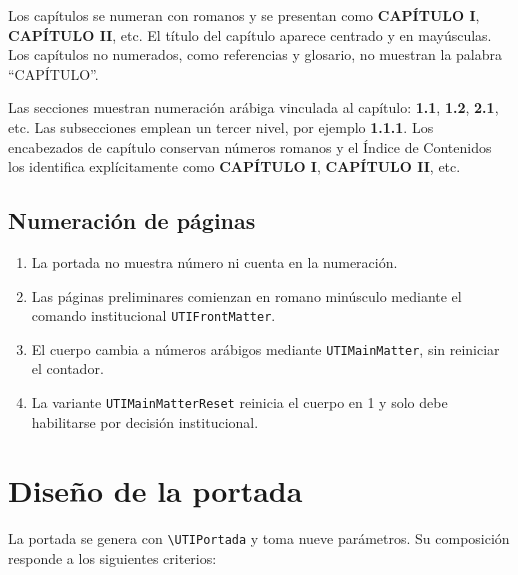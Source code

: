 \documentclass[12pt,a4paper,oneside]{report}
\begin{document}
Los capítulos se numeran con romanos y se presentan como \textbf{CAPÍTULO I}, \textbf{CAPÍTULO II}, etc. El título del capítulo aparece centrado y en mayúsculas. Los capítulos no numerados, como referencias y glosario, no muestran la palabra ``CAPÍTULO''.

Las secciones muestran numeración arábiga vinculada al capítulo: \textbf{1.1}, \textbf{1.2}, \textbf{2.1}, etc. Las subsecciones emplean un tercer nivel, por ejemplo \textbf{1.1.1}. Los encabezados de capítulo conservan números romanos y el Índice de Contenidos los identifica explícitamente como \textbf{CAPÍTULO I}, \textbf{CAPÍTULO II}, etc.

\section{Numeración de páginas}

\begin{enumerate}
  \item La portada no muestra número ni cuenta en la numeración.
  \item Las páginas preliminares comienzan en romano minúsculo mediante el comando institucional \texttt{UTIFrontMatter}.
  \item El cuerpo cambia a números arábigos mediante \texttt{UTIMainMatter}, sin reiniciar el contador.
  \item La variante \texttt{UTIMainMatterReset} reinicia el cuerpo en 1 y solo debe habilitarse por decisión institucional.
\end{enumerate}

\chapter{Diseño de la portada}

La portada se genera con \texttt{\textbackslash UTIPortada} y toma nueve parámetros. Su composición responde a los siguientes criterios:
\end{document}
